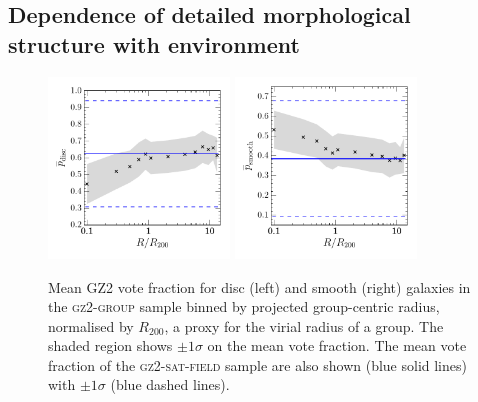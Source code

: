 \documentclass[useAMS,usenatbib]{mn2e}
\begin{document}
\subsection{Dependence of detailed morphological structure with environment}\label{sec:resmorph}

\begin{figure}
\includegraphics[width=0.43\textwidth]{p_disc_trend_with_log_radius_field_compare.pdf}
\includegraphics[width=0.43\textwidth]{p_smooth_trend_with_log_radius_field_compare.pdf}
\caption[Mean $p_d$ and $p_s$ with group radius in the \textsc{gz2-group} sample]{Mean GZ2 vote fraction for disc (left) and smooth (right) galaxies in the \textsc{gz2-group} sample binned by projected group-centric radius, normalised by $R_{200}$, a proxy for the virial radius of a group. The shaded region shows $\pm1\sigma$ on the mean vote fraction. The mean vote fraction of the \textsc{gz2-sat-field} sample are also shown (blue solid lines) with $\pm1\sigma$ (blue dashed lines).}
\label{fig:morphradius}
\end{figure}
\end{document}

